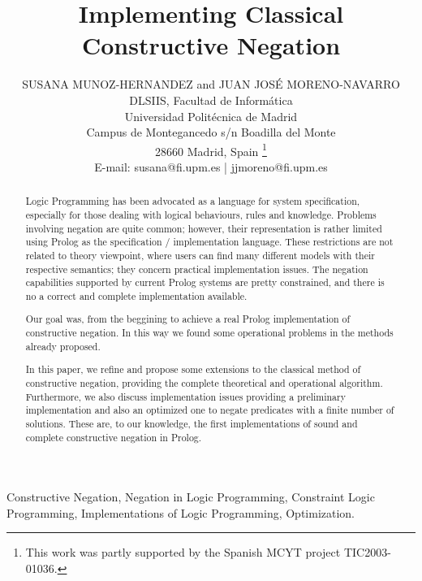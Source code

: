 \documentclass{tlp}
\begin{document}


\long{}


\title{Implementing Classical Constructive Negation}

\author[S. Munoz-Hernandez and J.J. Moreno-Navarro]
{SUSANA MUNOZ-HERNANDEZ and JUAN JOS\'{E} MORENO-NAVARRO \\
DLSIIS, Facultad de Inform\'{a}tica \\
Universidad Polit\'{e}cnica de  Madrid \\ 
Campus de Montegancedo s/n Boadilla del Monte\\
28660 Madrid, Spain \footnote{This work was partly supported by the
Spanish MCYT project TIC2003-01036.} \\
E-mail: susana@fi.upm.es | jjmoreno@fi.upm.es
}

\pagerange{\pageref{firstpage}--\pageref{lastpage}}
\setcounter{page}{1}

\maketitle

\label{firstpage}

\begin{abstract}
%
  Logic Programming has been advocated as a language for system specification,
  especially for those dealing with logical behaviours, rules and
  knowledge. Problems involving negation are quite common; however, their
  representation is rather limited using Prolog as the specification /
  implementation language. These restrictions are not related to theory
  viewpoint, where users can find many different models with their respective
  semantics; they concern practical implementation issues. The negation
  capabilities supported by current Prolog systems are pretty constrained, and
  there is no a correct and complete implementation available.

  Our goal was, from the beggining to achieve a real Prolog implementation of
  constructive negation. In this way we found some operational problems in the
  methods already proposed.
 
In this paper, we refine and propose some extensions to the classical method
  of constructive negation, providing the complete theoretical and operational
  algorithm. Furthermore, we also discuss implementation issues providing a
  preliminary implementation and also an optimized one to negate predicates
  with a finite number of solutions. These are, to our knowledge, the first
  implementations of sound and complete constructive negation in Prolog.
\end{abstract}
\begin{keywords}
Constructive Negation, Negation in Logic Programming, Constraint Logic
Programming, Implementations of Logic Programming, Optimization.
\end{keywords}
\end{document}
